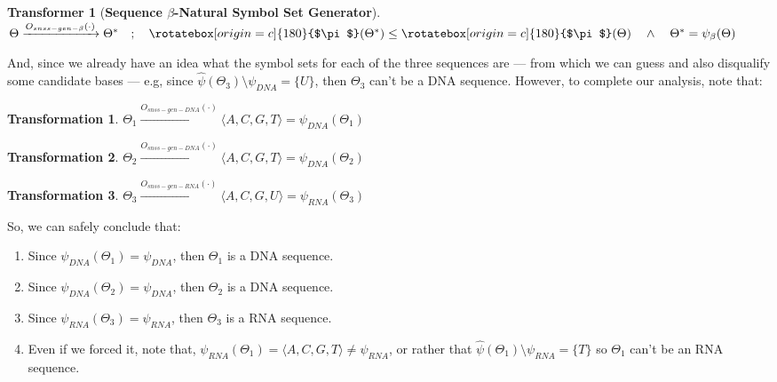\documentclass[a4paper, 18pt]{book} %
\newtheorem{trans}{Transformation}
\newtheorem{transf}{Transformer}
\newcommand{\invpi}{\rotatebox[origin=c]{180}{$\pi$}}
\begin{document}
\vspace{1em}

\begin{transf}[\textbf{Sequence $\beta$-Natural Symbol Set Generator}]
\label{TRANSNSGEN}$ $\\
$\Theta \xrightarrow{O_{snss-gen-\beta}(\cdot)} \Theta^* \quad;\quad \invpi(\Theta^*) \leq \invpi(\Theta) \quad \land \quad \Theta^* = \psi_\beta(\Theta)$
\end{transf}

\vspace{1em}

And, since we already have an idea what the symbol sets for each of the three sequences are --- from which we can guess and also disqualify some candidate bases --- e.g, since $\hat{\psi}(\Theta_3) \setminus \psi_{DNA} = \{U\}$, then $\Theta_3$ can't be a DNA sequence. However, to complete our analysis, note that:

\vspace{1em}

\begin{trans}
$\Theta_1 \xrightarrow{O_{snss-gen-DNA}(\cdot)} \langle A, C, G, T \rangle = \psi_{DNA}(\Theta_1)$
\end{trans}

\begin{trans}
$\Theta_2 \xrightarrow{O_{snss-gen-DNA}(\cdot)} \langle A, C, G, T \rangle = \psi_{DNA}(\Theta_2)$
\end{trans}

\begin{trans}
$\Theta_3 \xrightarrow{O_{snss-gen-RNA}(\cdot)} \langle A, C, G, U \rangle = \psi_{RNA}(\Theta_3)$\\
\end{trans}

\vspace{1em}

So, we can safely conclude that:

\begin{enumerate}
\item Since $\psi_{DNA}(\Theta_1) = \psi_{DNA}$, then $\Theta_1$ is a DNA sequence.
\item Since $\psi_{DNA}(\Theta_2) = \psi_{DNA}$, then $\Theta_2$ is a DNA sequence.
\item Since $\psi_{RNA}(\Theta_3) = \psi_{RNA}$, then $\Theta_3$ is a RNA sequence.
\item Even if we forced it, note that, $\psi_{RNA}(\Theta_1) = \langle A, C, G, T \rangle \neq \psi_{RNA}$, or rather that $\hat{\psi}(\Theta_1) \setminus \psi_{RNA} = \{T\}$ so $\Theta_1$ can't be an RNA sequence.
\end{enumerate} 
\end{document}
